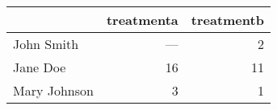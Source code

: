 \begin{tabular}{lrr}
  \toprule
  & treatmenta & treatmentb \\ 
  \midrule
  John Smith & --- &   2 \\ 
  Jane Doe &  16 &  11 \\ 
  Mary Johnson &   3 &   1 \\ 
   \bottomrule
\end{tabular}
